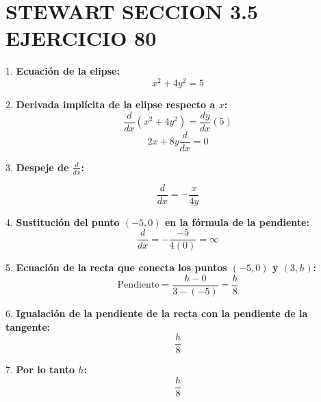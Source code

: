 \chapter*{STEWART SECCION 3.5 EJERCICIO 80}
1. \textbf{Ecuación de la elipse:}
\[
x^2 + 4y^2 = 5
\]

2. \textbf{Derivada implícita de la elipse respecto a \(x\):}
\[
\frac{d}{dx}(x^2 + 4y^2) = \frac{dy}{dx}(5)
\]
\[
2x + 8y\frac{d}{dx} = 0
\]

3. \textbf{Despeje de \( \frac{d}{dx} \):}

\[
\frac{d}{dx} = -\frac{x}{4y}
\]

4. \textbf{Sustitución del punto \((-5, 0)\) en la fórmula de la pendiente:}
\[
\frac{d}{dx} = -\frac{-5}{4(0)} = \infty
\]

5. \textbf{Ecuación de la recta que conecta los puntos \((-5, 0)\) y \((3, h)\):}
\[
\text{Pendiente} = \frac{h - 0}{3 - (-5)} = \frac{h}{8}
\]

6. \textbf{Igualación de la pendiente de la recta con la pendiente de la tangente:}
\[
\frac{h}{8}
\]

7. \textbf{Por lo tanto \(h\):}
\[
\frac{h}{8} 
\]

